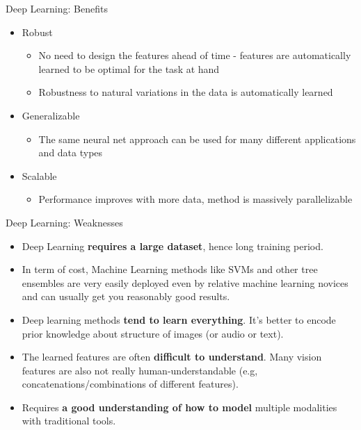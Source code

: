 \documentclass[ignorenonframetext,]{beamer}
\providecommand{\tightlist}{%
\setlength{\itemsep}{0pt}\setlength{\parskip}{0pt}}
\begin{document}
\begin{frame}{Deep Learning: Benefits}

\begin{itemize}
\tightlist
\item
  Robust

  \begin{itemize}
  \tightlist
  \item
    No need to design the features ahead of time - features are
    automatically learned to be optimal for the task at hand
  \item
    Robustness to natural variations in the data is automatically
    learned
  \end{itemize}
\item
  Generalizable

  \begin{itemize}
  \tightlist
  \item
    The same neural net approach can be used for many different
    applications and data types
  \end{itemize}
\item
  Scalable

  \begin{itemize}
  \tightlist
  \item
    Performance improves with more data, method is massively
    parallelizable
  \end{itemize}
\end{itemize}

\end{frame}

\begin{frame}{Deep Learning: Weaknesses}

\begin{itemize}
\tightlist
\item
  Deep Learning \textbf{requires a large dataset}, hence long training
  period.
\item
  In term of cost, Machine Learning methods like SVMs and other tree
  ensembles are very easily deployed even by relative machine learning
  novices and can usually get you reasonably good results.
\item
  Deep learning methods \textbf{tend to learn everything}. It's better
  to encode prior knowledge about structure of images (or audio or
  text).
\item
  The learned features are often \textbf{difficult to understand}. Many
  vision features are also not really human-understandable (e.g,
  concatenations/combinations of different features).
\item
  Requires \textbf{a good understanding of how to model} multiple
  modalities with traditional tools.
\end{itemize}

\end{frame}
\end{document}
